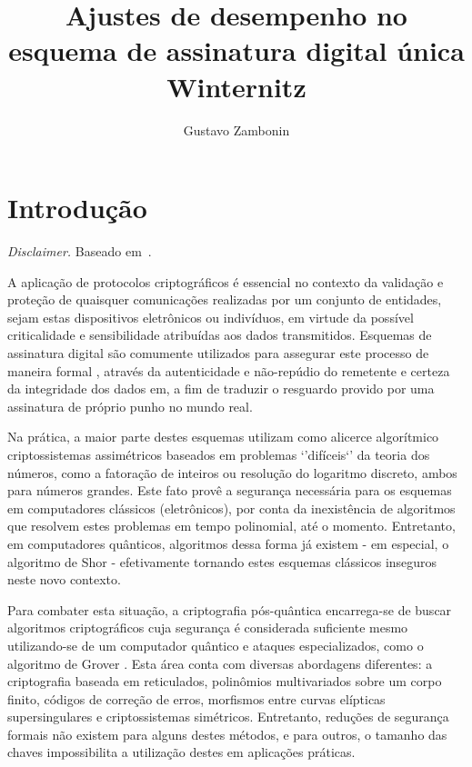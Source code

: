 \documentclass[12pt]{report}
\title{Ajustes de desempenho no esquema de assinatura digital única Winternitz}
\author{Gustavo Zambonin}
\date{}
\begin{document}
\maketitle

\chapter{Introdução}

\emph{Disclaimer.} Baseado em~\cite{Peri1806:Tuning}.

A aplicação de protocolos criptográficos é essencial no contexto da validação e
proteção de quaisquer comunicações realizadas por um conjunto de entidades,
sejam estas dispositivos eletrônicos ou indivíduos, em virtude da possível
criticalidade e sensibilidade atribuídas aos dados transmitidos. Esquemas de
assinatura digital são comumente utilizados para assegurar este processo de
maneira formal \cite{Goldreich:2004:FCV:975541}, através da autenticidade e
não-repúdio do remetente e certeza da integridade dos dados em, a fim de
traduzir o resguardo provido por uma assinatura de próprio punho no mundo real.

Na prática, a maior parte destes esquemas utilizam como alicerce algorítmico
criptossistemas assimétricos baseados em problemas `'difíceis`' da teoria
dos números, como a fatoração de inteiros ou resolução do logaritmo discreto,
ambos para números grandes. Este fato provê a segurança necessária para os
esquemas em computadores clássicos (eletrônicos), por conta da inexistência de
algoritmos que resolvem estes problemas em tempo polinomial, até o momento.
Entretanto, em computadores quânticos, algoritmos dessa forma já existem - em
especial, o algoritmo de Shor \cite{Shor:1997:PAP:264393.264406} - efetivamente
tornando estes esquemas clássicos inseguros neste novo contexto.

Para combater esta situação, a criptografia pós-quântica encarrega-se de buscar
algoritmos criptográficos cuja segurança é considerada suficiente mesmo
utilizando-se de um computador quântico e ataques especializados, como o
algoritmo de Grover \cite{Grover:1996:FQM:237814.237866}. Esta área conta com
diversas abordagens diferentes: a criptografia baseada em reticulados,
polinômios multivariados sobre um corpo finito, códigos de correção de erros,
morfismos entre curvas elípticas supersingulares e criptossistemas simétricos.
Entretanto, reduções de segurança formais não existem para alguns destes
métodos, e para outros, o tamanho das chaves impossibilita a utilização destes
em aplicações práticas.
\end{document}
